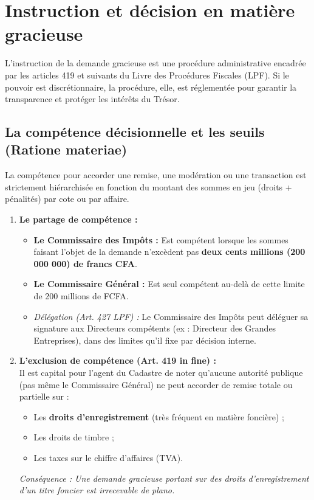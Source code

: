 \documentclass[Cours_contentieuxTF2026.tex]{subfiles}
\begin{document}
 \section{Instruction et décision en matière gracieuse}
 
 L'instruction de la demande gracieuse est une procédure administrative encadrée par les articles 419 et suivants du Livre des Procédures Fiscales (LPF). Si le pouvoir est discrétionnaire, la procédure, elle, est réglementée pour garantir la transparence et protéger les intérêts du Trésor.
 
 \subsection{La compétence décisionnelle et les seuils (Ratione materiae)}
 
 La compétence pour accorder une remise, une modération ou une transaction est strictement hiérarchisée en fonction du montant des sommes en jeu (droits + pénalités) par cote ou par affaire.
 
 \begin{enumerate}
 	\item \textbf{Le partage de compétence :}
 	\begin{itemize}
 		\item \textbf{Le Commissaire des Impôts :} Est compétent lorsque les sommes faisant l'objet de la demande n'excèdent pas \textbf{deux cents millions (200 000 000) de francs CFA}.
 		\item \textbf{Le Commissaire Général :} Est seul compétent au-delà de cette limite de 200 millions de FCFA.
 		\item \textit{Délégation (Art. 427 LPF) :} Le Commissaire des Impôts peut déléguer sa signature aux Directeurs compétents (ex : Directeur des Grandes Entreprises), dans des limites qu'il fixe par décision interne.
 	\end{itemize}
 	
 	\item \textbf{L'exclusion de compétence (Art. 419 in fine) :} \\
 	Il est capital pour l'agent du Cadastre de noter qu'aucune autorité publique (pas même le Commissaire Général) ne peut accorder de remise totale ou partielle sur :
 	\begin{itemize}
 		\item Les \textbf{droits d'enregistrement} (très fréquent en matière foncière) ;
 		\item Les droits de timbre ;
 		\item Les taxes sur le chiffre d'affaires (TVA).
 	\end{itemize}
 	\textit{Conséquence : Une demande gracieuse portant sur des droits d'enregistrement d'un titre foncier est irrecevable de plano.}
 \end{enumerate}
 
\end{document}
